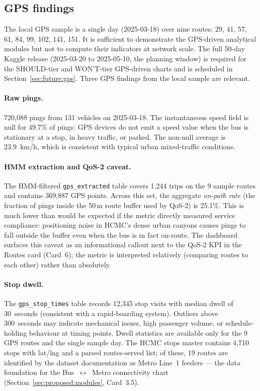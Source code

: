\subsection{GPS findings}

The local GPS sample is a single day (2025-03-18) over nine
routes: 29, 41, 57, 61, 84, 99, 102, 141, 151. It is sufficient
to demonstrate the GPS-driven analytical modules but not to
compute their indicators at network scale. The full 50-day Kaggle
release (2025-03-20 to 2025-05-10, the planning window) is
required for the SHOULD-tier and WON'T-tier GPS-driven charts and
is scheduled in Section~\ref{sec:future:gps}. Three GPS findings
from the local sample are relevant.

\paragraph{Raw pings.}
720{,}088 pings from 131 vehicles on 2025-03-18. The instantaneous
speed field is null for 49.7\% of pings: GPS devices do not emit a
speed value when the bus is stationary at a stop, in heavy
traffic, or parked. The non-null average is 23.9~km/h, which is
consistent with typical urban mixed-traffic conditions.

\paragraph{HMM extraction and QoS-2 caveat.}
The HMM-filtered \texttt{gps\_extracted} table covers 1{,}244
trips on the 9 sample routes and contains 369{,}887 GPS points.
Across this set, the aggregate \emph{on-path rate} (the fraction
of pings inside the 50\,m route buffer used by QoS-2) is 25.1\%.
This is much lower than would be expected if the metric directly
measured service compliance: positioning noise in HCMC's dense
urban canyons causes pings to fall outside the buffer even when
the bus is in fact on-route. The dashboard surfaces this caveat
as an informational callout next to the QoS-2 KPI in the Routes
card (Card~6); the metric is interpreted relatively (comparing
routes to each other) rather than absolutely.

\paragraph{Stop dwell.}
The \texttt{gps\_stop\_times} table records 12{,}345 stop visits
with median dwell of 30~seconds (consistent with a rapid-boarding
system). Outliers above 300~seconds may indicate mechanical issues,
high passenger volume, or schedule-holding behaviour at timing
points. Dwell statistics are available only for the 9 GPS routes
and the single sample day. The HCMC stops master contains 4{,}710
stops with lat/lng and a parsed routes-served list; of these,
19 routes are identified by the dataset documentation as Metro
Line~1 feeders --- the data foundation for the
Bus~$\leftrightarrow$~Metro connectivity chart
(Section~\ref{sec:proposed:modules}, Card~3.5).

